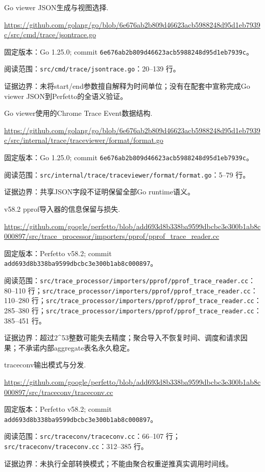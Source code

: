 \documentclass[UTF8,fontset=fandol,openany,11pt]{ctexbook}
\begin{document}
\begin{thebibliography}{999}
 Go viewer JSON生成与视图选择.\par
\url{https://github.com/golang/go/blob/6e676ab2b809d46623acb5988248d95d1eb7939c/src/cmd/trace/jsontrace.go}\par
{\small\raggedright 固定版本：Go 1.25.0; commit \texttt{6e676ab2\allowbreak{}b809d466\allowbreak{}23acb598\allowbreak{}8248d95d\allowbreak{}1eb7939c}。\par
阅读范围：\nolinkurl{src/cmd/trace/jsontrace.go}：20–139 行。\par
证据边界：未将start/end参数擅自解释为时间单位；没有在配套中宣称完成Go viewer JSON到Perfetto的全语义验证。
}

 Go viewer使用的Chrome Trace Event数据结构.\par
\url{https://github.com/golang/go/blob/6e676ab2b809d46623acb5988248d95d1eb7939c/src/internal/trace/traceviewer/format/format.go}\par
{\small\raggedright 固定版本：Go 1.25.0; commit \texttt{6e676ab2\allowbreak{}b809d466\allowbreak{}23acb598\allowbreak{}8248d95d\allowbreak{}1eb7939c}。\par
阅读范围：\nolinkurl{src/internal/trace/traceviewer/format/format.go}：5–79 行。\par
证据边界：共享JSON字段不证明保留全部Go runtime语义。
}

 v58.2 pprof导入器的信息保留与损失.\par
\url{https://github.com/google/perfetto/blob/add693d8b338ba9599dbcbc3e300b1ab8c000897/src/trace_processor/importers/pprof/pprof_trace_reader.cc}\par
{\small\raggedright 固定版本：Perfetto v58.2; commit \texttt{add693d8\allowbreak{}b338ba95\allowbreak{}99dbcbc3\allowbreak{}e300b1ab\allowbreak{}8c000897}。\par
阅读范围：\nolinkurl{src/trace_processor/importers/pprof/pprof_trace_reader.cc}：80–110 行；\nolinkurl{src/trace_processor/importers/pprof/pprof_trace_reader.cc}：110–280 行；\nolinkurl{src/trace_processor/importers/pprof/pprof_trace_reader.cc}：285–380 行；\nolinkurl{src/trace_processor/importers/pprof/pprof_trace_reader.cc}：385–451 行。\par
证据边界：超过2\textasciicircum{}53整数可能失去精度；聚合导入不恢复时间、调度和请求因果；不承诺内部aggregate表名永久稳定。
}

 traceconv输出模式与分发.\par
\url{https://github.com/google/perfetto/blob/add693d8b338ba9599dbcbc3e300b1ab8c000897/src/traceconv/traceconv.cc}\par
{\small\raggedright 固定版本：Perfetto v58.2; commit \texttt{add693d8\allowbreak{}b338ba95\allowbreak{}99dbcbc3\allowbreak{}e300b1ab\allowbreak{}8c000897}。\par
阅读范围：\nolinkurl{src/traceconv/traceconv.cc}：66–107 行；\nolinkurl{src/traceconv/traceconv.cc}：312–385 行。\par
证据边界：未执行全部转换模式；不能由聚合权重逆推真实调用时间线。
}


\end{thebibliography}
\end{document}
